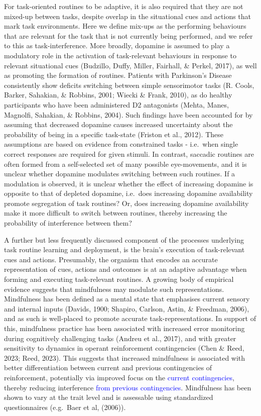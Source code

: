 \documentclass[
  man]{apa6}
\begin{document}
For task-oriented routines to be adaptive, it is also required that they are not mixed-up between tasks, despite overlap in the situational cues and actions that mark task environments. Here we define mix-ups as the performing behaviours that are relevant for the task that is not currently being performed, and we refer to this as task-interference. More broadly, dopamine is assumed to play a modulatory role in the activation of task-relevant behaviours in response to relevant situational cues (Budzillo, Duffy, Miller, Fairhall, \& Perkel, 2017), as well as promoting the formation of routines. Patients with Parkinson's Disease consistently show deficits switching between simple sensorimotor tasks (R. Cools, Barker, Sahakian, \& Robbins, 2001; Wiecki \& Frank, 2010), as do healthy participants who have been administered D2 antagonists (Mehta, Manes, Magnolfi, Sahakian, \& Robbins, 2004). Such findings have been accounted for by assuming that decreased dopamine causes increased uncertainty about the probability of being in a specific task-state (Friston et al., 2012). These assumptions are based on evidence from constrained tasks - i.e.~when single correct responses are required for given stimuli. In contrast, saccadic routines are often formed from a self-selected set of many possible eye-movements, and it is unclear whether dopamine modulates switching between such routines. If a modulation is observed, it is unclear whether the effect of increasing dopamine is opposite to that of depleted dopamine, i.e.~does increasing dopamine availability promote segregation of task routines? Or, does increasing dopamine availability make it more difficult to switch between routines, thereby increasing the probability of interference between them?

A further but less frequently discussed component of the processes underlying task routine learning and deployment, is the brain's execution of task-relevant cues and actions. Presumably, the organism that encodes an accurate representation of cues, actions and outcomes is at an adaptive advantage when forming and executing task-relevant routines. A growing body of empirical evidence suggests that mindfulness may modulate such representations. Mindfulness has been defined as a mental state that emphasises current sensory and internal inputs (Davids, 1900; Shapiro, Carlson, Astin, \& Freedman, 2006), and as such is well-placed to promote accurate task-representations. In support of this, mindfulness practice has been associated with increased error monitoring during cognitively challenging tasks (Andreu et al., 2017), and with greater sensitivity to dynamics in operant reinforcement contingencies (Chen \& Reed, 2023; Reed, 2023). This suggests that increased mindfulness is associated with better differentiation between current and previous contingencies of reinforcement, potentially via improved focus on the \textcolor{blue}{current contingencies}, thereby reducing interference \textcolor{blue}{from previous contingencies}. Mindfulness has been shown to vary at the trait level and is assessable using standardized questionnaires (e.g.~Baer et al, (2006)).
\end{document}
